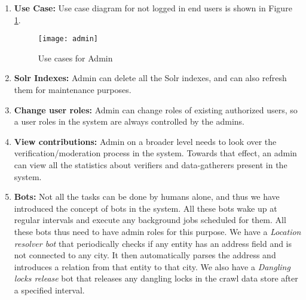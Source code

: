 \begin{enumerate}
    \item \textbf{Use Case:} Use case diagram for not logged in end users is shown in Figure \ref{fig:admin}.

    \begin{figure}[H]
    \begin{center}  
    \texttt{[image: admin]} 
    \caption{Use cases for Admin}
    \label{fig:admin}
    \end{center}
    \end{figure}
    

     \item \textbf{Solr Indexes:} Admin can delete all the Solr indexes, and can also refresh them for maintenance purposes.

     \item \textbf{Change user roles:} Admin can change roles of existing authorized users, so a user roles in the system are always controlled by the admins.


     \item \textbf{View contributions:} Admin on a broader level needs to look over the verification/moderation process in the system. Towards that effect, an admin can view all the statistics about verifiers and data-gatherers present in the system.

     \item \textbf{Bots:} Not all the tasks can be done by humans alone, and thus we have introduced the concept of bots in the system. All these bots wake up at regular intervals and execute any background jobs scheduled for them. All these bots thus need to have admin roles for this purpose. We have a \emph{Location resolver bot} that periodically checks if any entity has an address field and is not connected to any city. It then automatically parses the address and introduces a relation from that entity to that city. We also have a \emph{Dangling locks release} bot that releases any dangling locks in the crawl data store after a specified interval.   

\end{enumerate}